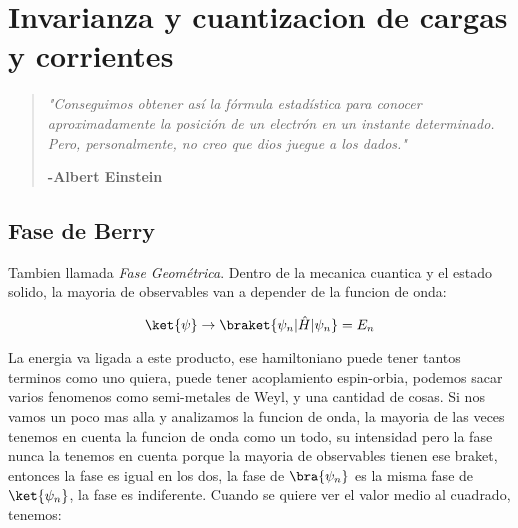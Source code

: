 \documentclass[11pt,fleqn]{book}
\begin{document}


\pagestyle{empty} %
\renewcommand\contentsname{Contenido}
\tableofcontents %


\pagestyle{fancy} %


\renewcommand{\chaptername}{}
\chapter{Invarianza y cuantizacion de cargas y corrientes}

\begin{quote}
\emph{"Conseguimos obtener así la fórmula estadística para conocer aproximadamente la posición de un electrón en un instante determinado. Pero, personalmente, no creo que dios juegue a los dados."}
\begin{flushright}
\textbf{-Albert Einstein}
\end{flushright}
\headrule
\end{quote}

\section{Fase de Berry}

Tambien llamada \textit{Fase Geométrica}. Dentro de la mecanica cuantica y el estado solido, la mayoria de observables van a depender de la funcion de onda:

\begin{equation}
    \ket{\psi}\rightarrow\braket{\psi_{n}|\hat{H}|\psi_{n}}=E_{n}  
\end{equation}

La energia va ligada a este producto, ese hamiltoniano puede tener tantos terminos como uno quiera, puede tener acoplamiento espin-orbia, podemos sacar varios fenomenos como semi-metales de Weyl, y una cantidad de cosas. Si nos vamos un poco mas alla y analizamos la funcion de onda, la mayoria de las veces tenemos en cuenta la funcion de onda como un todo, su intensidad pero la fase nunca la tenemos en cuenta porque la mayoria de observables tienen ese braket, entonces la fase es igual en los dos, la fase de $\bra{\psi_{n}}$ es la misma fase de $\ket{\psi_{n}}$, la fase es indiferente. Cuando se quiere ver el valor medio al cuadrado, tenemos:
\end{document}
